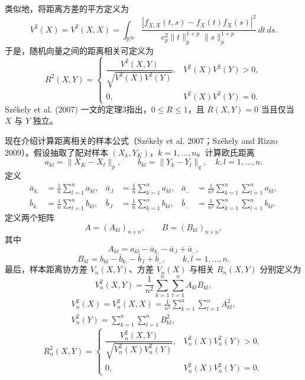类似地，将距离方差的平方定义为
\begin{equation}
V^2(X)=V^2(X,X)=\int_{\mathbb R^{2p}}
\frac{|f_{X,X}(t,s)-f_X(t)f_X(s)|^2}
{c_p^2\lVert t\rVert_p^{1+p}\lVert s\rVert_p^{1+p}}\,dt\,ds.
\tag{1.769}
\end{equation}
于是，随机向量之间的距离相关可定义为
\begin{equation}
R^2(X,Y)=\begin{cases}
\dfrac{V^2(X,Y)}{\sqrt{V^2(X)V^2(Y)}},&V^2(X)V^2(Y)>0,\\[1ex]
0,&V^2(X)V^2(Y)=0.
\end{cases}
\tag{7.170}
\end{equation}
Székely et al. (2007) 一文的定理3指出，$0\le R\le1$，且 $R(X,Y)=0$ 当且仅当 $X$ 与 $Y$ 独立。

现在介绍计算距离相关的样本公式（Székely et al. 2007；Székely and Rizzo 2009）。假设抽取了配对样本 $(X_k,Y_K)$，$k=1,\ldots,n$。计算欧氏距离
\[
a_{kl}=\lVert X_K-X_l\rVert_p,\qquad b_{kl}=\lVert Y_k-Y_l\rVert_q,
\quad k,l=1,\ldots,n.
\]
定义
\[
\begin{aligned}
\bar a_{k.}&=\frac1n\sum_{l=1}^na_{kl},&
\bar a_{.l}&=\frac1n\sum_{k=1}^na_{kl},&
\bar a_{..}&=\frac1{n^2}\sum_{k=1}^n\sum_{l=1}^na_{kl},\\
\bar b_{k.}&=\frac1n\sum_{l=1}^nb_{kl},&
\bar b_{.l}&=\frac1n\sum_{k=1}^nb_{kl},&
\bar b_{..}&=\frac1{n^2}\sum_{k=1}^n\sum_{l=1}^nb_{kl}.
\end{aligned}
\]
定义两个矩阵
\[
A=(A_{kl})_{n\times n},\qquad B=(B_{kl})_{n\times n},
\]
其中
\begin{equation}
A_{kl}=a_{kl}-\bar a_{k.}-\bar a_{.l}+\bar a_{..},
\tag{7.171}
\end{equation}
\begin{equation}
B_{kl}=b_{kl}-\bar b_{k.}-\bar b_{.l}+\bar b_{..},\qquad k,l=1,\ldots,n.
\tag{7.172}
\end{equation}
最后，样本距离协方差 $V_n(X,Y)$、方差 $V_n(X)$ 与相关 $R_n(X,Y)$ 分别定义为
\begin{equation}
V_n^2(X,Y)=\frac1{n^2}\sum_{k=1}^n\sum_{l=1}^nA_{kl}B_{kl},
\tag{7.173}
\end{equation}
\begin{equation}
\begin{gathered}
V_n^2(X)=V_n^2(X,X)=\frac1{n^2}\sum_{k=1}^n\sum_{l=1}^nA_{kl}^2,\\
V_n^2(Y)=\sum_{k=1}^n\sum_{l=1}^nB_{kl}^2,
\end{gathered}
\tag{7.174}
\end{equation}
\begin{equation}
R_n^2(X,Y)=\begin{cases}
\dfrac{V_n^2(X,Y)}{\sqrt{V_n^2(X)V_n^2(Y)}},&V_n^2(X)V_n^2(Y)>0,\\[1ex]
0,&V_n^2(X)V_n^2(Y)=0.
\end{cases}
\tag{7.175}
\end{equation}


